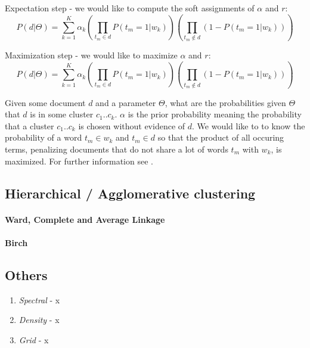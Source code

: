       \begin{descriptin}
        \item[Expectation step] - we would like to compute the soft assignments of $\alpha$ and $r$:
          \begin{equation}
            P(d|\Theta) = \sum_{k=1}^{K}\alpha_k\left ( \prod_{t_m \in d} P(t_m = 1|w_k) \right ) \left ( \prod_{t_m \not\in d} (1 - P(t_m = 1|w_k)) \right )
          \end{equation}

        \item[Maximization step] - we would like to maximize $\alpha$ and $r$:
          \begin{equation}
            P(d|\Theta) = \sum_{k=1}^{K}\alpha_k\left ( \prod_{t_m \in d} P(t_m = 1|w_k) \right ) \left ( \prod_{t_m \not\in d} (1 - P(t_m = 1|w_k)) \right )
          \end{equation}

      \end{descriptin}

    Given some document $d$ and a parameter $\Theta$, what are the probabilities given $\Theta$ that $d$ is in some cluster $c_1..c_k$. $\alpha$ is the prior probability meaning the probability that a cluster $c_1..c_k$ is chosen without evidence of $d$. We would like to to know the probability of a word $t_m \in w_k$ and $t_m \in d$ so that the product of all occuring terms, penalizing documents that do not share a lot of words $t_m$ with $w_k$, is maximized. For further information see \cite{IRBookStanford2008}.


  \subsection{Hierarchical / Agglomerative clustering}
    \paragraph{Ward, Complete and Average Linkage}
    \paragraph{Birch}

    \subsection{Others}
      \begin{enumerate}
        \item \emph{Spectral} - x
        \item \emph{Density} - x
        \item \emph{Grid} - x
      \end{enumerate}


